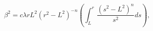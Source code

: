 \begin{equation}
\beta^{2}=c\lambda rL^{2}(r^{2}-L^{2})^{-n}\left(
\int_{L}^{r}\frac{(s^{2}-L^{2})^{n}}{s^{2}}ds\right), \label{betaNUT}
\end{equation}

